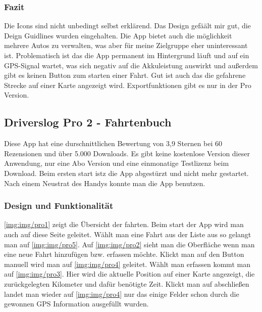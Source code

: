 \subsubsection{Fazit}
Die Icons sind nicht unbedingt selbst erklärend. Das Design gefäält mir gut, die 
Deign Guidlines wurden eingehalten. Die App bietet auch die möglichkeit mehrere Autos zu verwalten, was 
aber für meine Zielgruppe eher uninteressant ist. Problematisch ist das die App permanent im Hintergrund läuft
und auf ein GPS-Signal wartet, was sich negativ auf die Akkuleistung auswirkt und außerdem gibt es keinen
Button zum starten einer Fahrt. Gut ist auch das die gefahrene Strecke auf einer Karte angezeigt wird.
Exportfunktionen gibt es nur in der Pro Version. 

\subsection{Driverslog Pro 2 - Fahrtenbuch}
Diese App hat eine durschnittlichen Bewertung von 3,9 Sternen bei 60 Rezensionen und über 5.000 Downloads.
Es gibt keine kostenlose Version dieser Anwendung, nur eine Abo Version und eine einmonatige Testlizenz beim Download.
Beim ersten start istz die App abgestürzt und nicht mehr gestartet. Nach einem Neustrat des Handys konnte man die App
benutzen.

\subsubsection{Design und Funktionalität}
\ref{img:img/pro1} zeigt die Übersicht der fahrten. Beim start der App wird man auch auf diese Seite geleitet.
Wählt man eine Fahrt aus der Liste aus so gelangt man auf \ref{img:img/pro5}.
Auf \ref{img:img/pro2} sieht man die Oberfläche wenn man eine neue Fahrt hinzufügen bzw. erfassen möchte. 
Klickt man auf den Button manuell wird man auf \ref{img:img/pro4} geleitet. Wählt man erfassen kommt man 
auf \ref{img:img/pro3}. Hier wird die aktuelle Position auf einer Karte angezeigt, die zurückgelegten Kilometer und
dafür benötigte Zeit. Klickt man auf abschließen landet man wieder auf \ref{img:img/pro4} nur das einige Felder schon 
durch die gewonnen GPS Information ausgefüllt wurden.

